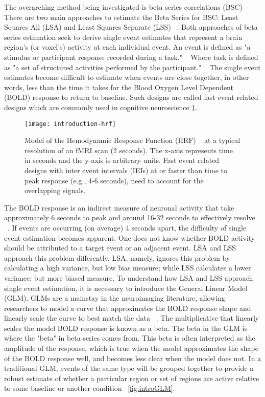 \documentclass[10pt,letterpaper]{article}
\begin{document}
The overarching method being investigated is beta series correlations (BSC) ~\cite{Rissman2004,Mumford2012,Turner2012a,Abdulrahman2016}
There are two main approaches to estimate the Beta Series for BSC: Least Squares All (LSA) and Least Squares Separate (LSS) ~\cite{Mumford2012}.
Both approaches of beta series estimation seek to derive single event estimates that represent a brain region's
(or voxel's) activity at each individual event.
An event is defined as "a stimulus or participant response recorded during a task." ~\cite{Gorgolewski2016}
Where task is defined as "a set of structured activities performed by the participant." ~\cite{Gorgolewski2016}
The single event estimates become difficult to estimate when events are close together,
in other words, less than the time it takes for the Blood Oxygen Level Dependent (BOLD) response to return to baseline.
Such designs are called fast event related designs which are commonly used in cognitive neuroscience \ref{fig:introhrf}.

\begin{figure}[H]
  \centering
  \texttt{[image: introduction-hrf]}
  \caption{
    Model of the Hemodynamic Response Function (HRF) ~\cite{Glover1999} at a
    typical resolution of an fMRI scan (2 seconds).
    The x-axis represents time in seconds and the y-axis is arbitrary units.
    Fast event related designs with inter event intervals (IEIs) at or faster than time to peak
    response (e.g., 4-6 seconds), need to account for the overlapping signals.
  }
  \label{fig:introhrf}
\end{figure}

The BOLD response is an indirect measure of neuronal activity that take approximately 6 seconds to
peak and around 16-32 seconds to effectively resolve ~\cite{Glover1999}.
If events are occurring (on average) 4 seconds apart, the difficulty of single event estimation
becomes apparent.
One does not know whether BOLD activity should be attributed to a target event or an
adjacent event.
LSA and LSS approach this problem differently.
LSA, namely, ignores this problem by calculating a high variance, but low bias measure;
while LSS calculates a lower variance; but more biased measure.
To understand how LSA and LSS approach single event estimation, it is necessary to introduce
the General Linear Model (GLM).
GLMs are a mainstay in the neuroimaging literature, allowing researchers to model
a curve that approximates the BOLD response shape and linearly scale the curve
to best match the data ~\cite{Friston1995}.
The multiplicative that linearly scales the model BOLD response is known as a beta.
The beta in the GLM is where the "beta" in beta series comes from.
This beta is often interpreted as the amplitude of the response, which is true when the
model approximates the shape of the BOLD response well, and becomes less clear when
the model does not.
In a traditional GLM, events of the same type will be grouped together
to provide a robust estimate of whether a particular region or set of regions are
active relative to some baseline or another condition ~\ref{fig:introGLM}.
\end{document}
